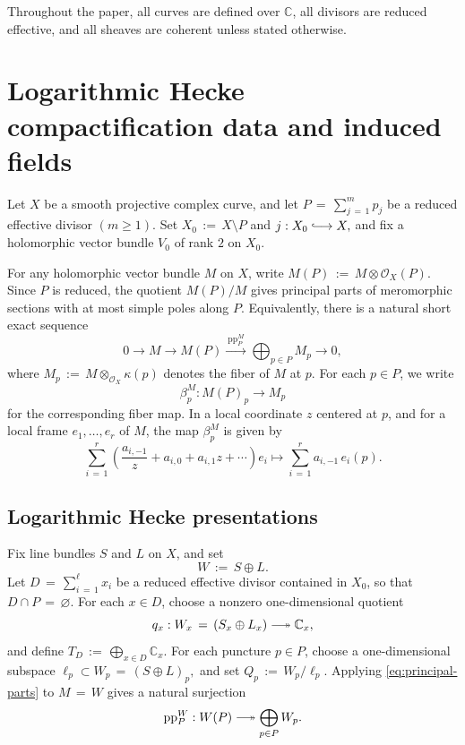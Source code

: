 \documentclass[a4paper,12pt]{amsart}
\numberwithin{equation}{section}
\theoremstyle{definition}
\newcommand{\OO}{\mathcal{O}}
\newcommand{\longtwoheadrightarrow}{\mathrel{\relbar\joinrel\twoheadrightarrow}}
\newcommand{\longhookrightarrow}{\mathrel{\lhook\joinrel\longrightarrow}}
\begin{document}
Throughout the paper, all curves are defined over \(\mathbb C\), all divisors are reduced effective, and all sheaves are coherent unless stated otherwise.
\section{Logarithmic Hecke compactification data and induced fields}\label{sec:log-hecke}
Let \(X\) be a smooth projective complex curve, and let
\(
P\,=\,\sum_{j\,=\,1}^m p_j
\)
be a reduced effective divisor $(m\geq 1)$. Set 
\(
X_0\,:=\,X\setminus P\)  and \(j:X_0\longhookrightarrow X,
\)
and fix a holomorphic vector bundle \(V_0\) of rank \(2\) on \(X_0\).

For any holomorphic vector bundle \(M\) on \(X\), write
\(
M(P)\,:=\,M\otimes \OO_X(P).
\)
Since \(P\) is reduced, the quotient \(M(P)/M\) gives principal parts of meromorphic sections with at most simple poles along \(P\).  Equivalently, there is a natural short exact sequence
\begin{equation}\label{eq:principal-parts}
0\longrightarrow M\longrightarrow M(P)\xrightarrow{\ \operatorname{pp}_P^M\ }\bigoplus_{p\in P} M_p\longrightarrow 0,
\end{equation}
where \(M_p\,:=\,M\otimes_{\OO_X}\kappa(p)\) denotes the fiber of \(M\) at \(p\).  For each \(p\in P\), we write
\[
\beta_p^M:M(P)_p\longrightarrow M_p
\]
for the corresponding fiber map.  In a local coordinate \(z\) centered at \(p\), and for a local frame \(e_1,\dots,e_r\) of \(M\), the map \(\beta_p^M\) is given by
\[
\sum_{i\,=\,1}^r\left(\frac{a_{i,-1}}{z}+a_{i,0}+a_{i,1}z+\cdots\right)e_i
\longmapsto
\sum_{i\,=\,1}^r a_{i,-1}\,e_i(p).
\]

\subsection{Logarithmic Hecke presentations}
Fix line bundles \(S\) and \(L\) on \(X\), and set
\[
W\,:=\,S\oplus L.
\]
Let
\(
D\,=\,\sum_{i\,=\,1}^{\ell}x_i
\)
be a reduced effective divisor contained in \(X_0\), so that \(D\cap P\,=\,\varnothing\).  For each \(x\in D\), choose a nonzero one-dimensional quotient
\[
q_x:W_x\,=\,(S_x\oplus L_x)\longtwoheadrightarrow \mathbb C_x,
\]
and define
\(
T_D\,:=\,\bigoplus_{x\in D}\mathbb C_x.
\)
For each puncture \(p\in P\), choose a one-dimensional subspace
\(
\ell_p\subset W_p\,=\,(S\oplus L)_p,
\)
and set
\(
Q_p\,:=\,W_p/\ell_p.
\)
Applying \eqref{eq:principal-parts} to \(M\,=\,W\) gives a natural surjection
\[
\operatorname{pp}_P^W:W(P)\longtwoheadrightarrow \bigoplus_{p\in P}W_p.
\]
\end{document}
